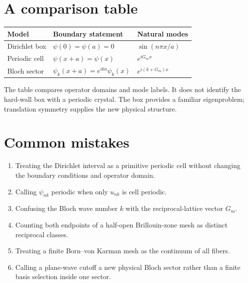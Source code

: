 
\section{A comparison table}

\begin{center}
\begin{tabular}{@{}lll@{}}
\toprule
Model & Boundary statement & Natural modes \\
\midrule
Dirichlet box & $\psi(0)=\psi(a)=0$ & $\sin(n\pi x/a)$ \\
Periodic cell & $\psi(x+a)=\psi(x)$ & $e^{iG_mx}$ \\
Bloch sector & $\psi_k(x+a)=e^{ika}\psi_k(x)$ & $e^{i(k+G_m)x}$ \\
\bottomrule
\end{tabular}
\end{center}

The table compares operator domains and mode labels. It does not identify the
hard-wall box with a periodic crystal. The box provides a familiar eigenproblem;
translation symmetry supplies the new physical structure.

\section{Common mistakes}

\begin{enumerate}
  \item Treating the Dirichlet interval as a primitive periodic cell without
        changing the boundary conditions and operator domain.
  \item Calling $\psi_{nk}$ periodic when only $u_{nk}$ is cell periodic.
  \item Confusing the Bloch wave number $k$ with the reciprocal-lattice vector
        $G_m$.
  \item Counting both endpoints of a half-open Brillouin-zone mesh as distinct
        reciprocal classes.
  \item Treating a finite Born--von Karman mesh as the continuum of all fibers.
  \item Calling a plane-wave cutoff a new physical Bloch sector rather than a
        finite basis selection inside one sector.
\end{enumerate}

